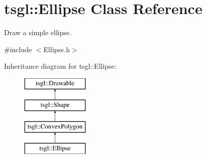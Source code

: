 \hypertarget{classtsgl_1_1_ellipse}{}\section{tsgl\+:\+:Ellipse Class Reference}
\label{classtsgl_1_1_ellipse}


Draw a simple ellipse.  




{\ttfamily \#include $<$Ellipse.\+h$>$}

Inheritance diagram for tsgl\+:\+:Ellipse\+:\begin{figure}[H]
\begin{center}
\leavevmode
\includegraphics[height=4.000000cm]{classtsgl_1_1_ellipse}
\end{center}
\end{figure}
